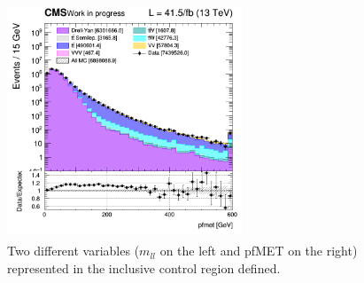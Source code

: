 \documentclass[a4paper, 10pt, openright]{report}
\begin{document}
\begin{figure}[htbp]
{\begin{minipage}[b]{.48\textwidth}
\end{minipage}\hfill
\begin{minipage}[b]{.48\textwidth}
\includegraphics[width=7cm, height=7cm]{figs/2017/log_cratio_inclusiveCR_ll_METcorrected_pt.png}
\end{minipage} \hfill
}
\caption{Two different variables ($m_{ll}$ on the left and pf\ac{MET} on the right) represented in the inclusive control region defined.}
\label{fig:inclusiveCR}
\end{figure}
\end{document}

